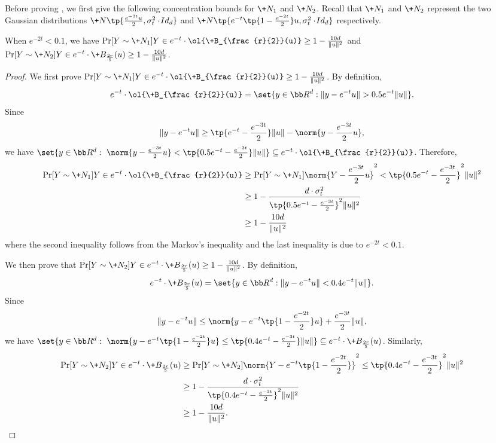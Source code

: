 Before proving , we first give the following concentration bounds for $\+N_1$ and $\+N_2$. Recall that $\+N_1$ and $\+N_2$ represent the two Gaussian distributions $\+N\tp{\frac{e^{-3t}u}{2}, \sigma_t^2 \cdot \!{Id}_d}$ and $\+N\tp{e^{-t}\tp{1-\frac{e^{-2t}}{2}}u, \sigma_t^2 \cdot \!{Id}_d}$ respectively. 
\begin{proposition}\label{prop:stitched0}
    When $e^{-2t}<0.1$, we have $\Pr[Y\sim \+N_1]{Y\in e^{-t}\cdot \ol{\+B_{\frac{r}{2}}(u)}} \geq 1 - \frac{10d}{\|u\|^2}$ and $\Pr[Y\sim \+N_2]{Y\in e^{-t}\cdot \+B_{\frac{2r}{5}}(u)} \geq 1- \frac{10d}{\|u\|^2}$.
\end{proposition}
\begin{proof}
    We first prove $\Pr[Y\sim \+N_1]{Y\in e^{-t}\cdot \ol{\+B_{\frac{r}{2}}(u)}} \geq 1 - \frac{10d}{\|u\|^2}$. By definition, 
    \[
        e^{-t}\cdot \ol{\+B_{\frac{r}{2}}(u)} = \set{y\in \bb R^d: \|y - e^{-t}u\| > 0.5e^{-t}\|u\|}.
    \]
    Since 
    \[
        \|y - e^{-t}u\| \geq \tp{e^{-t} - \frac{e^{-3t}}{2}} \|u\| - \norm{y - \frac{e^{-3t}}{2} u },
    \]
    we have $\set{y\in \bb R^d:\ \norm{y - \frac{e^{-3t}}{2} u } < \tp{0.5 e^{-t} - \frac{e^{-3t}}{2}}\|u\|} \subseteq e^{-t}\cdot \ol{\+B_{\frac{r}{2}}(u)}$. Therefore, 
    \begin{align*}
        \Pr[Y\sim \+N_1]{Y\in e^{-t}\cdot \ol{\+B_{\frac{r}{2}}(u)}} &\geq \Pr[Y\sim \+N_1]{\norm{Y - \frac{e^{-3t}}{2} u }^2 < \tp{0.5 e^{-t} - \frac{e^{-3t}}{2}}^2\|u\|^2}  \\
        &\geq 1 - \frac{d\cdot \sigma_t^2}{\tp{0.5 e^{-t} - \frac{e^{-3t}}{2}}^2\|u\|^2} \\
        &\geq 1 - \frac{10d}{\|u\|^2}
    \end{align*}
    where the second inequality follows from the Markov's inequality and the last inequality is due to $e^{-2t}< 0.1$.

    We then prove that $\Pr[Y\sim \+N_2]{Y\in e^{-t}\cdot \+B_{\frac{2r}{5}}(u)} \geq 1- \frac{10d}{\|u\|^2}$. By definition, 
    \[
        e^{-t}\cdot \+B_{\frac{2r}{5}}(u) = \set{y\in \bb R^d: \|y - e^{-t}u\| < 0.4e^{-t}\|u\|}.
    \]
    Since
    \[
        \|y - e^{-t}u\| \leq \norm{y -  e^{-t}\tp{1-\frac{e^{-2t}}{2}}u} + \frac{e^{-3t}}{2}\|u\|,
    \]
    we have $\set{y\in \bb R^d :\ \norm{ y -  e^{-t}\tp{1-\frac{e^{-2t}}{2}}u}\leq\tp{0.4 e^{-t} - \frac{e^{-3t}}{2}}\|u\|} \subseteq e^{-t}\cdot \+B_{\frac{2r}{5}}(u)$. Similarly,
    \begin{align*}
        \Pr[Y\sim \+N_2]{Y\in e^{-t}\cdot \+B_{\frac{2r}{5}}(u)} &\geq \Pr[Y\sim \+N_2]{\norm{Y -  e^{-t}\tp{1-\frac{e^{-2t}}{2}}}^2 \leq\tp{0.4 e^{-t} - \frac{e^{-3t}}{2}}^2\|u\|^2}  \\
        &\geq 1- \frac{d\cdot \sigma_t^2}{\tp{0.4 e^{-t} - \frac{e^{-3t}}{2}}^2\|u\|^2} \\
        &\geq 1- \frac{10d}{\|u\|^2}.
    \end{align*}
\end{proof}

